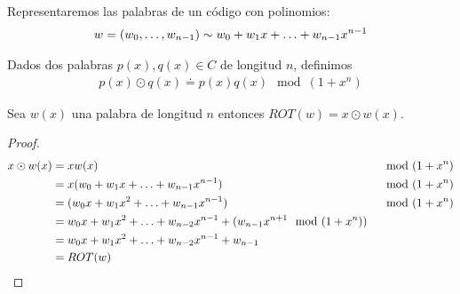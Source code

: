 Representaremos las palabras de un código con polinomios:
\begin{align}
    w = (w_0, \mathellipsis, w_{n-1}) \sim w_0 + w_1 x + \mathellipsis + w_{n-1} x^{n-1}
\end{align}


\begin{definition}
Dados dos palabras $p(x), q(x) \in C$ de longitud $n$, definimos
\begin{align}
    p(x) \odot q(x) \doteq p(x) q(x) \mod{(1+x^n)}
\end{align}
\end{definition}

\begin{proposition}
Sea $w(x)$ una palabra de longitud $n$ entonces $ROT(w) = x \odot w(x)$.
\end{proposition}
\begin{proof}
\begin{align}
    x \odot w(x)
    &= xw(x) &&\mod{(1+x^n)}\\
    &= x(w_0 + w_1 x + \mathellipsis + w_{n-1} x^{n-1}) &&\mod{(1+x^n)}\\
    &= (w_0 x + w_1 x^2 + \mathellipsis + w_{n-1} x^{n-1}) &&\mod{(1+x^n)}\\
    &= w_0 x + w_1 x^2 + \mathellipsis + w_{n-2} x^{n-1} + (w_{n-1} x^{n+1} \mod{(1+x^n)})\\
    &= w_0 x + w_1 x^2 + \mathellipsis + w_{n-2} x^{n-1} + w_{n-1}\\
    &= ROT(w)
\end{align}
\end{proof}



